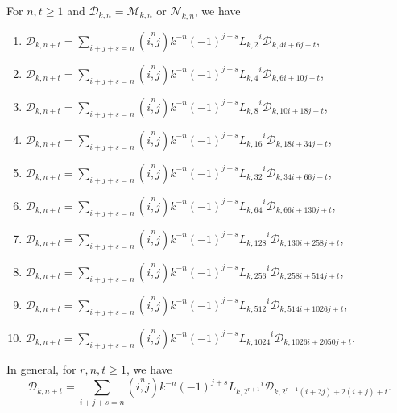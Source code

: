 \begin{theorem} For $n, t\geq 1$ and $\mathcal{D}_{k,n}=\mathcal{M}_{k,n}$ or $\mathcal{N}_{k,n}$, we have\label{3.6}
\begin{enumerate}
\item $\mathcal{D}_{k,n+t}=\sum\limits_{i+j+s=n}^{}\left( \stackrel{n}{i,j}\right) k^{-n}(-1)^{j+s}{L_{k,2}}^i\mathcal{D}_{k,4i+6j+t} $,
\item $\mathcal{D}_{k,n+t}=\sum\limits_{i+j+s=n}\left( \stackrel{n}{i,j}\right) k^{-n}(-1)^{j+s}{L_{k,4}}^i\mathcal{D}_{k,6i+10j+t} $,
\item $\mathcal{D}_{k,n+t}=\sum\limits_{i+j+s=n}\left( \stackrel{n}{i,j}\right) k^{-n}(-1)^{j+s}{L_{k,8}}^i\mathcal{D}_{k,10i+18j+t} $,
\item $\mathcal{D}_{k,n+t}=\sum\limits_{i+j+s=n}\left( \stackrel{n}{i,j}\right) k^{-n}(-1)^{j+s}{L_{k,16}}^i\mathcal{D}_{k,18i+34j+t} $,
\item $\mathcal{D}_{k,n+t}=\sum\limits_{i+j+s=n}\left( \stackrel{n}{i,j}\right) k^{-n}(-1)^{j+s}{L_{k,32}}^i\mathcal{D}_{k,34i+66j+t} $,
\item $\mathcal{D}_{k,n+t}=\sum\limits_{i+j+s=n}\left( \stackrel{n}{i,j}\right) k^{-n}(-1)^{j+s}{L_{k,64}}^i\mathcal{D}_{k,66i+130j+t} $,
\item $\mathcal{D}_{k,n+t}=\sum\limits_{i+j+s=n}\left( \stackrel{n}{i,j}\right) k^{-n}(-1)^{j+s}{L_{k,128}}^i\mathcal{D}_{k,130i+258j+t} $,
\item $\mathcal{D}_{k,n+t}=\sum\limits_{i+j+s=n}\left( \stackrel{n}{i,j}\right) k^{-n}(-1)^{j+s}{L_{k,256}}^i\mathcal{D}_{k,258i+514j+t} $,
\item $\mathcal{D}_{k,n+t}=\sum\limits_{i+j+s=n}\left( \stackrel{n}{i,j}\right) k^{-n}(-1)^{j+s}{L_{k,512}}^i\mathcal{D}_{k,514i+1026j+t} $,
\item $\mathcal{D}_{k,n+t}=\sum\limits_{i+j+s=n}\left( \stackrel{n}{i,j}\right) k^{-n}(-1)^{j+s}{L_{k,1024}}^i\mathcal{D}_{k,1026i+2050j+t} $.
\end{enumerate}
In general, for $r, n, t\geq 1$, we have
$$\mathcal{D}_{k,n+t}=\sum\limits_{i+j+s=n}\left( \stackrel{n}{i,j}\right) k^{-n}(-1)^{j+s}{L_{k,2^{r+1}}}^i\mathcal{D}_{k,2^{r+1}(i+2j)+2(i+j)+t}. $$
\end{theorem}
